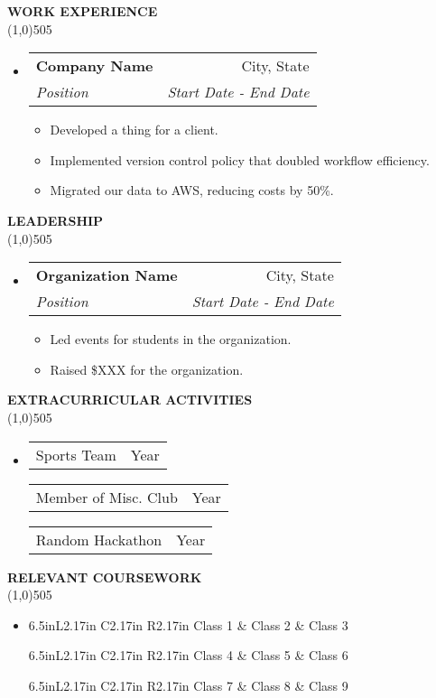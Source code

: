 \documentclass[letterpaper,10pt]{article}
\makeatletter
\newlength{\outerbordwidth}
\newcommand{\resitem}[1]{\item[\bullet] #1 \vspace{-4pt}}
\newcommand{\resheading}[1]{\vspace{3pt}
  \parbox{\textwidth}{\setlength{\FrameSep}{\outerbordwidth}
  \vspace{-4pt}
  \uppercase{\textbf{#1}}
  \vspace{-3mm} \\
  \line(1,0){505} \\
  }\vspace{-5mm}
}
\newcommand{\ressubheading}[4]{
\begin{tabular*}{6.5in}{p{11cm}@{\cftdotfill{\cftsecdotsep}\extracolsep{\fill}}r}
		\textbf{#1} & #2 \\
		\textit{#3} & \textit{#4} \\
\end{tabular*}\vspace{-6pt}}
\newcommand{\activity}[2]{
\begin{tabular*}{6.5in}{p{15cm}@{\cftdotfill{\cftsecdotsep}\extracolsep{\fill}}r}
		#1 & #2 \\
\end{tabular*}\vspace{0pt}}
\newcommand{\coursework}[3]{
\begin{tabular*}{6.5in}{L{2.17in} C{2.17in} R{2.17in}}
		#1 & #2 & #3 \\
\end{tabular*}\vspace{0pt}}
\makeatother
\begin{document}
\vspace{5pt}

\resheading{Work Experience}
\begin{itemize}
\item[]
	\ressubheading{Company Name}{City, State}{Position}{Start Date - End Date}
	\begin{itemize}
		\resitem{Developed a thing for a client.}
		\resitem{Implemented version control policy that doubled workflow efficiency.}
		\resitem{Migrated our data to AWS, reducing costs by 50\%.}
	\end{itemize}
\end{itemize}

\vspace{1.5mm}

\resheading{Leadership}
\begin{itemize}
\item[]
	\ressubheading{Organization Name}{City, State}{Position}{Start Date - End Date}
	\begin{itemize}
		\resitem{Led events for students in the organization.}
		\resitem{Raised \$XXX for the organization.}
	\end{itemize}
\end{itemize}

\vspace{1.5mm}

\resheading{Extracurricular Activities}
\begin{itemize}
\item[]
	\activity{Sports Team}{Year}
	\activity{Member of Misc. Club}{Year}
	\activity{Random Hackathon}{Year}
\end{itemize}

\vspace{0mm}

\resheading{Relevant Coursework}
\begin{itemize}
\item[]
	\coursework{Class 1}{Class 2}{Class 3}
	\coursework{Class 4}{Class 5}{Class 6}
	\coursework{Class 7}{Class 8}{Class 9}
\end{itemize}
\end{document}
